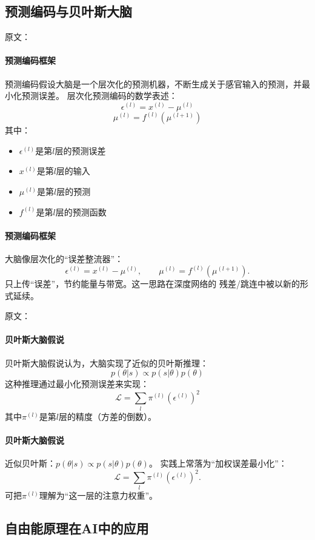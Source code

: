 \subsection{预测编码与贝叶斯大脑}

原文：
\paragraph{预测编码框架}
预测编码假设大脑是一个层次化的预测机器，不断生成关于感官输入的预测，并最小化预测误差。
层次化预测编码的数学表述：
$$\epsilon^{(l)} = x^{(l)} - \mu^{(l)}$$
$$\mu^{(l)} = f^{(l)}(\mu^{(l+1)})$$
其中：
\begin{itemize}
\item $\epsilon^{(l)}$是第$l$层的预测误差
\item $x^{(l)}$是第$l$层的输入
\item $\mu^{(l)}$是第$l$层的预测
\item $f^{(l)}$是第$l$层的预测函数
\end{itemize}
\paragraph{预测编码框架}
大脑像层次化的“误差整流器”：  
$$\epsilon^{(l)}=x^{(l)}-\mu^{(l)},\qquad \mu^{(l)}=f^{(l)}(\mu^{(l+1)}).$$
只上传“误差”，节约能量与带宽。\;这一思路在深度网络的  
残差/跳连中被以新的形式延续。

原文：
\paragraph{贝叶斯大脑假说}
贝叶斯大脑假说认为，大脑实现了近似的贝叶斯推理：
$$p(\theta|s) \propto p(s|\theta) p(\theta)$$
这种推理通过最小化预测误差来实现：
$$\mathcal{L} = \sum_{l} \pi^{(l)} (\epsilon^{(l)})^2$$
其中$\pi^{(l)}$是第$l$层的精度（方差的倒数）。
\paragraph{贝叶斯大脑假说}
近似贝叶斯：$p(\theta|s)\propto p(s|\theta)p(\theta)$。  
实践上常落为“加权误差最小化”：
$$\mathcal{L}=\sum_l \pi^{(l)}(\epsilon^{(l)})^2.$$
可把$\pi^{(l)}$理解为“这一层的注意力权重”。

\subsection{自由能原理在AI中的应用}

